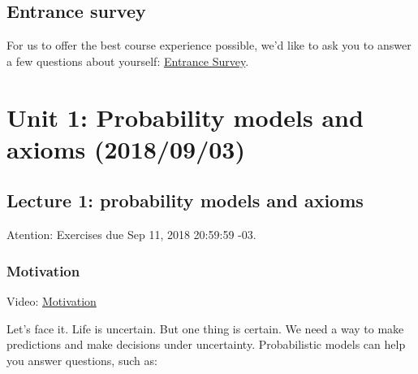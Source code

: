 \documentclass[pdftex, brazil, 12pt, twoside]{article}
\begin{document}
\subsection{Entrance survey}
\label{ovw0-survey}

For us to offer the best course experience possible, we'd like to ask you
to answer a few questions about yourself: \href{survey.pdf}{Entrance Survey}.




\section{Unit 1: Probability models and axioms (2018/09/03)}
\label{un1}


\subsection{Lecture 1: probability models and axioms}
\label{un1-lec1}

Atention: Exercises due Sep 11, 2018 20:59:59 -03.

\subsubsection{Motivation}
\label{un1-lec1-motiv}

Video: \href{https://d2f1egay8yehza.cloudfront.net/MIT6041XT114-V036600\_DTH.mp4}{Motivation}

Let's face it.
Life is uncertain.
But one thing is certain.
We need a way to make predictions and make decisions
under uncertainty.
Probabilistic models can help you answer questions, such as:
\end{document}
